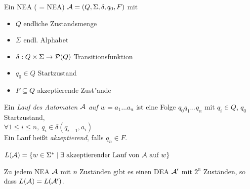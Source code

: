 \begin{Def}[name={[NEA]}]
	Ein \ac{NEA} ( = \acl{NEA}) $\mathcal{A} = (Q,\Sigma,\delta,q_0,F)$ mit
	\begin{itemize}
		\item $Q$ endliche Zustandsmenge
		\item $\Sigma$ endl. Alphabet
		\item $\delta:Q\x\Sigma\->\mathcal{P}(Q)$ Transitionsfunktion
		\item $q_0\in Q$ Startzustand
		\item $F\subseteq Q$ akzeptierende Zust"ande
	\end{itemize}
\end{Def}
\begin{Def}[name={[Lauf eines Automaten]}]
        Ein \emph{Lauf des Automaten $\mathcal{A}$ auf $w=a_1\dots a_n$} ist eine Folge $q_0q_1\dots q_n$ mit $q_i\in Q$, $q_0$ Startzustand,\\
        $\forall 1\leq i\leq n,\ q_i\in\delta(q_{i-1},a_i)$\\
        Ein Lauf heißt \emph{akzeptierend}, falls $q_n\in F$.
\end{Def}
\begin{Def}[name={[NEA zu DEA]}]
	$L(\mathcal{A})=\{ w\in\Sigma^* \mid \exists\text{ akzeptierender Lauf von $\mathcal{A}$ auf }w \}$
\end{Def}
\begin{Satz}[Rabin]
	Zu jedem \ac{NEA} $\mathcal{A}$ mit $n$ Zuständen gibt es einen \ac{DEA} $\mathcal{A}'$ mit $2^n$ Zuständen, so dass $L(\mathcal{A})=L(\mathcal{A}')$.
\end{Satz}

